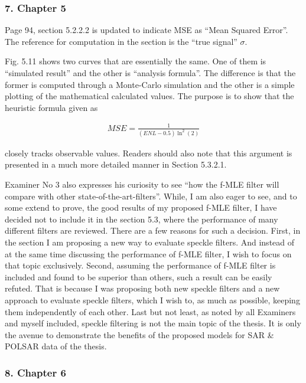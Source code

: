 \subsubsection*{7. Chapter 5}

Page 94, section 5.2.2.2 is updated to indicate MSE as ``Mean Squared Error''.
The reference for computation in the section is the ``true signal'' $\sigma$.

Fig. 5.11 shows two curves that are essentially the same.
One of them is ``simulated result'' and the other is ``analysis formula''.
The difference is that the former is computed through a Monte-Carlo simulation and the other is a simple plotting of the mathematical calculated values.
The purpose is to show that the heuristic formula given as

\begin{align*}
  MSE = \frac{1}{(ENL-0.5)\ln^2(2)}
\end{align*}  

closely tracks observable values.
Readers should also note that this argument is presented in a much more detailed manner in Section 5.3.2.1.

Examiner No 3 also expresses his curiosity to see ``how the f-MLE filter will compare with other state-of-the-art-filters''.
While, I am also eager to see, and to some extend to prove, the good results of my proposed f-MLE filter,
  I have decided not to include it in the section 5.3, where the performance of many different filters are reviewed.
There are a few reasons for such a decision.
First, in the section I am proposing a new way to evaluate speckle filters.
And instead of at the same time discussing the performance of f-MLE filter, I wish to focus on that topic exclusively.
Second, assuming the performance of f-MLE filter is included and found to be superior than others,
  such a result can be easily refuted.
That is because I was proposing both new speckle filters and a new approach to evaluate speckle filters,
  which I wish to, as much as possible, keeping them independently of each other.
Last but not least, as noted by all Examiners and myself included, speckle filtering is not the main topic of the thesis.
It is only the avenue to demonstrate the benefits of the proposed models for SAR \& POLSAR data of the thesis.

\subsubsection*{8. Chapter 6}

